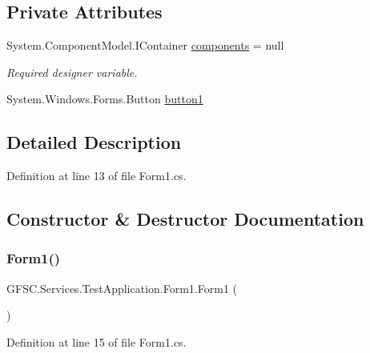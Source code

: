 \subsection*{Private Attributes}
\begin{DoxyCompactItemize}
\item 
System.\+Component\+Model.\+I\+Container \mbox{\hyperlink{class_g_f_s_c_1_1_services_1_1_test_application_1_1_form1_ad0e40b009844f6e3a3260a89afcb3ca3}{components}} = null
\begin{DoxyCompactList}\small\item\em Required designer variable. \end{DoxyCompactList}\item 
System.\+Windows.\+Forms.\+Button \mbox{\hyperlink{class_g_f_s_c_1_1_services_1_1_test_application_1_1_form1_ab7915525bb57499d81a66f70d02f4e48}{button1}}
\end{DoxyCompactItemize}


\subsection{Detailed Description}


Definition at line 13 of file Form1.\+cs.



\subsection{Constructor \& Destructor Documentation}
\mbox{\label{class_g_f_s_c_1_1_services_1_1_test_application_1_1_form1_a09334d1ea6e59eb50fe44c27d8746353}} 
\subsubsection{\texorpdfstring{Form1()}{Form1()}}
{\footnotesize\ttfamily G\+F\+S\+C.\+Services.\+Test\+Application.\+Form1.\+Form1 (\begin{DoxyParamCaption}{ }\end{DoxyParamCaption})}



Definition at line 15 of file Form1.\+cs.



